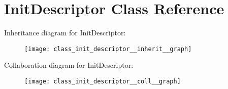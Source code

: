 \hypertarget{class_init_descriptor}{}\section{Init\+Descriptor Class Reference}
\label{class_init_descriptor}


Inheritance diagram for Init\+Descriptor\+:\nopagebreak
\begin{figure}[H]
\begin{center}
\leavevmode
\texttt{[image: class\_init\_descriptor\_\_inherit\_\_graph]}
\end{center}
\end{figure}


Collaboration diagram for Init\+Descriptor\+:\nopagebreak
\begin{figure}[H]
\begin{center}
\leavevmode
\texttt{[image: class\_init\_descriptor\_\_coll\_\_graph]}
\end{center}
\end{figure}
